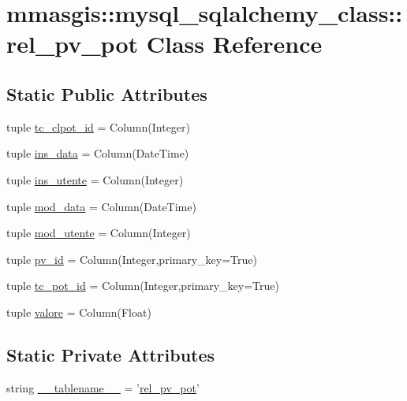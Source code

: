 \hypertarget{classmmasgis_1_1mysql__sqlalchemy__class_1_1rel__pv__pot}{
\section{mmasgis::mysql\_\-sqlalchemy\_\-class::rel\_\-pv\_\-pot Class Reference}
\label{classmmasgis_1_1mysql__sqlalchemy__class_1_1rel__pv__pot}
}
\subsection*{Static Public Attributes}
\begin{DoxyCompactItemize}
\item 
tuple \hyperlink{classmmasgis_1_1mysql__sqlalchemy__class_1_1rel__pv__pot_a4737fa1fb74933832dc3c8bf2eebd6d5}{tc\_\-clpot\_\-id} = Column(Integer)
\item 
tuple \hyperlink{classmmasgis_1_1mysql__sqlalchemy__class_1_1rel__pv__pot_ac01b2f5d81fb59aa29189af35109f222}{ins\_\-data} = Column(DateTime)
\item 
tuple \hyperlink{classmmasgis_1_1mysql__sqlalchemy__class_1_1rel__pv__pot_a66ea7d4fc8691eb43ae79064b2ca1728}{ins\_\-utente} = Column(Integer)
\item 
tuple \hyperlink{classmmasgis_1_1mysql__sqlalchemy__class_1_1rel__pv__pot_a928e24f1f2f35fc4ff10a9e7f4c285cb}{mod\_\-data} = Column(DateTime)
\item 
tuple \hyperlink{classmmasgis_1_1mysql__sqlalchemy__class_1_1rel__pv__pot_af83999f786a33c30426688b477db5f3f}{mod\_\-utente} = Column(Integer)
\item 
tuple \hyperlink{classmmasgis_1_1mysql__sqlalchemy__class_1_1rel__pv__pot_abb705238ad6888bf82c48a7b82d1d982}{pv\_\-id} = Column(Integer,primary\_\-key=True)
\item 
tuple \hyperlink{classmmasgis_1_1mysql__sqlalchemy__class_1_1rel__pv__pot_a456dd348158aae49113df29aeedb5201}{tc\_\-pot\_\-id} = Column(Integer,primary\_\-key=True)
\item 
tuple \hyperlink{classmmasgis_1_1mysql__sqlalchemy__class_1_1rel__pv__pot_a0352813c696bd8238c89a666ac741420}{valore} = Column(Float)
\end{DoxyCompactItemize}
\subsection*{Static Private Attributes}
\begin{DoxyCompactItemize}
\item 
string \hyperlink{classmmasgis_1_1mysql__sqlalchemy__class_1_1rel__pv__pot_a6f6260aa5d34db164acb60b9ea1ac68f}{\_\-\_\-tablename\_\-\_\-} = '\hyperlink{classmmasgis_1_1mysql__sqlalchemy__class_1_1rel__pv__pot}{rel\_\-pv\_\-pot}'
\end{DoxyCompactItemize}


